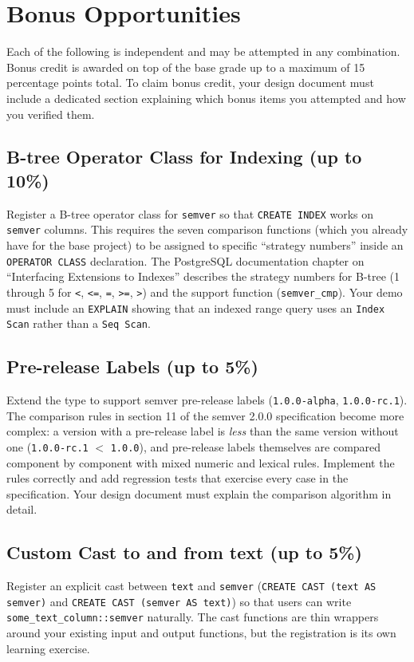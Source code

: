 \documentclass[11pt,a4paper]{article}
\begin{document}
\section{Bonus Opportunities}

Each of the following is independent and may be attempted in any combination. Bonus credit is awarded on top of the base grade up to a maximum of 15 percentage points total. To claim bonus credit, your design document must include a dedicated section explaining which bonus items you attempted and how you verified them.

\subsection{B-tree Operator Class for Indexing (up to 10\%)}
Register a B-tree operator class for \texttt{semver} so that \texttt{CREATE INDEX} works on \texttt{semver} columns. This requires the seven comparison functions (which you already have for the base project) to be assigned to specific ``strategy numbers'' inside an \texttt{OPERATOR CLASS} declaration. The PostgreSQL documentation chapter on ``Interfacing Extensions to Indexes'' describes the strategy numbers for B-tree (1 through 5 for \texttt{<}, \texttt{<=}, \texttt{=}, \texttt{>=}, \texttt{>}) and the support function (\texttt{semver\_cmp}). Your demo must include an \texttt{EXPLAIN} showing that an indexed range query uses an \texttt{Index Scan} rather than a \texttt{Seq Scan}.

\subsection{Pre-release Labels (up to 5\%)}
Extend the type to support semver pre-release labels (\texttt{1.0.0-alpha}, \texttt{1.0.0-rc.1}). The comparison rules in section 11 of the semver 2.0.0 specification become more complex: a version with a pre-release label is \textit{less} than the same version without one (\texttt{1.0.0-rc.1} $<$ \texttt{1.0.0}), and pre-release labels themselves are compared component by component with mixed numeric and lexical rules. Implement the rules correctly and add regression tests that exercise every case in the specification. Your design document must explain the comparison algorithm in detail.

\subsection{Custom Cast to and from text (up to 5\%)}
Register an explicit cast between \texttt{text} and \texttt{semver} (\texttt{CREATE CAST (text AS semver)} and \texttt{CREATE CAST (semver AS text)}) so that users can write \texttt{some\_text\_column::semver} naturally. The cast functions are thin wrappers around your existing input and output functions, but the registration is its own learning exercise.
\end{document}
